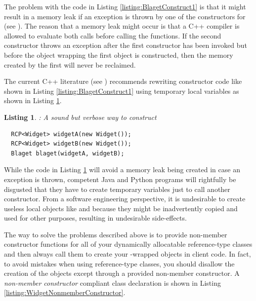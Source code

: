 \documentclass[pdf,ps2pdf,11pt]{SANDreport}
\newtheorem{listing}{Listing}
\begin{document}
The problem with the code in Listing {}\ref{listing:BlagetConstruct1}
is that it might result in a memory leak if an exception is thrown by
one of the constructors for {} (see {}\cite[Item
13]{C++CodingStandards05}).  The reason that a memory leak might occur
is that a C++ compiler is allowed to evaluate both {} calls before calling the {} functions.
If the second constructor {} throws an exception
after the first {} constructor has been invoked
but before the {} object wrapping the first
{} object is constructed, then the memory created by
the first {} will never be reclaimed.

The current C++ literature (see {}\cite[Item
13]{C++CodingStandards05}) recommends rewriting constructor code like
shown in Listing {}\ref{listing:BlagetConstruct1} using temporary local
variables as shown in Listing {}\ref{listing:BlagetConstruct2}.

\begin{listing}: A sound but verbose way to construct \\
\label{listing:BlagetConstruct2}
{\small\begin{verbatim}
  RCP<Widget> widgetA(new Widget());
  RCP<Widget> widgetB(new Widget());
  Blaget blaget(widgetA, widgetB);
\end{verbatim}}
\end{listing}

While the code in Listing {}\ref{listing:BlagetConstruct2} will avoid a
memory leak being created in case an exception is thrown, competent
Java and Python programs will rightfully be disgusted that they have
to create temporary variables just to call another constructor.  From
a software engineering perspective, it is undesirable to create
useless local {} objects like {} and
{} because they might be inadvertently copied and used
for other purposes, resulting in undesirable side-effects.

The way to solve the problems described above is to provide non-member
constructor functions for all of your dynamically allocatable
reference-type classes and then always call them to create your
{}-wrapped objects in client code.  In fact, to avoid
mistakes when using reference-type classes, you should disallow the
creation of the objects except through a provided non-member
constructor.  A {}\textit{non-member constructor} compliant
{} class declaration is shown in Listing
{}\ref{listing:WidgetNonmemberConstructor}.
\end{document}
